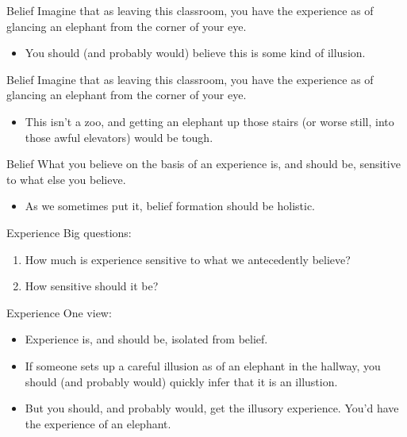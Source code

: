 \documentclass[
  17pt,
  letterpaper,
  ignorenonframetext,
  aspectratio=169,
  xcolor={dvipsnames}]{beamer}
\providecommand{\tightlist}{%
  \setlength{\itemsep}{0pt}\setlength{\parskip}{0pt}}\usepackage{longtable,booktabs,array}
\begin{document}
\begin{frame}{Belief}
\protect\hypertarget{belief}{}
Imagine that as leaving this classroom, you have the experience as of
glancing an elephant from the corner of your eye.

\begin{itemize}[<+->]
\tightlist
\item
  You should (and probably would) believe this is some kind of illusion.
\end{itemize}
\end{frame}

\begin{frame}{Belief}
\protect\hypertarget{belief-1}{}
Imagine that as leaving this classroom, you have the experience as of
glancing an elephant from the corner of your eye.

\begin{itemize}[<+->]
\tightlist
\item
  This isn't a zoo, and getting an elephant up those stairs (or worse
  still, into those awful elevators) would be tough.
\end{itemize}
\end{frame}

\begin{frame}{Belief}
\protect\hypertarget{belief-2}{}
What you believe on the basis of an experience is, and should be,
sensitive to what else you believe.

\begin{itemize}[<+->]
\tightlist
\item
  As we sometimes put it, belief formation should be holistic.
\end{itemize}
\end{frame}

\begin{frame}{Experience}
\protect\hypertarget{experience}{}
Big questions:

\begin{enumerate}[<+->]
\tightlist
\item
  How much is experience sensitive to what we antecedently believe?
\item
  How sensitive should it be?
\end{enumerate}
\end{frame}

\begin{frame}{Experience}
\protect\hypertarget{experience-1}{}
One view:

\begin{itemize}[<+->]
\tightlist
\item
  Experience is, and should be, isolated from belief.
\item
  If someone sets up a careful illusion as of an elephant in the
  hallway, you should (and probably would) quickly infer that it is an
  illustion.
\item
  But you should, and probably would, get the illusory experience. You'd
  have the experience of an elephant.
\end{itemize}
\end{frame}
\end{document}

